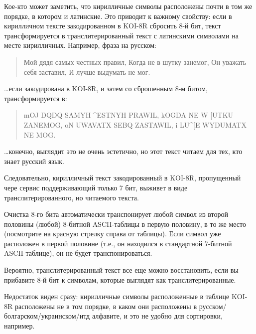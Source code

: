 Кое-кто может заметить, что кирилличные символы расположены почти в том же порядке, в котором и латинские.
Это приводит к важному свойству: если в кирилличном тексте закодированном в KOI-8R сбросить 8-й бит,
текст трансформируется в транслитерированный текст с латинскими символами на месте кирилличных.
Например, фраза на русском:

\begin{framed}
\begin{quotation}
Мой дядя самых честных правил, Когда не в шутку занемог, Он уважать себя заставил, И лучше выдумать не мог.
\end{quotation}
\end{framed}

\dots если закодирована в KOI-8R, и затем со сброшенным 8-м битом, трансформируется в:

\begin{framed}
\begin{quotation}
mOJ DQDQ SAMYH \^{}ESTNYH PRAWIL, kOGDA NE W [UTKU ZANEMOG, oN UWAVATX SEBQ ZASTAWIL, i LU\^{}[E WYDUMATX NE MOG.
\end{quotation}
\end{framed}

\dots конечно, выглядит это не очень эстетично, но этот текст читаем для тех, кто знает русский язык.

Следовательно, кирилличный текст закодированный в KOI-8R, пропущенный чере сервис поддерживающий только 7 бит,
выживет в виде транслитерированного, но читаемого текста.

Очистка 8-го бита автоматически транспонирует любой символ из второй половины (любой) 8-битной \ac{ASCII}-таблицы
в первую половину, в то же место (посмотрите на красную стрелку справа от таблицы).
Если символ уже расположен в первой половине (т.е., он находился в стандартной 7-битной \ac{ASCII}-таблице),
он не будет транспонироваться.

Вероятно, транслитерированный текст все еще можно восстановить, если вы прибавите 8-й бит к символам,
которые выглядят как транслитерированные.

Недостаток виден сразу: кирилличные символы расположенные в таблице KOI-8R расположены не в том порядке,
в каком они расположены в русском/болгарском/украинском/итд алфавите, и это не удобно для сортировки, например.

